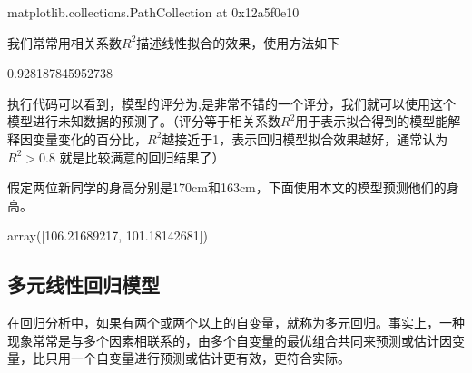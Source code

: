 \documentclass[letterpaper,10pt,english]{sphinxmanual}
\begin{document}
\begin{sphinxVerbatim}[commandchars=\\\{\}]
\PYGZlt{}matplotlib.collections.PathCollection at 0x12a5f0e10\PYGZgt{}
\end{sphinxVerbatim}

\noindent{}

我们常常用相关系数\(R^2\)描述线性拟合的效果，使用方法如下

\begin{sphinxVerbatim}[commandchars=\\\{\}]
\end{sphinxVerbatim}

\begin{sphinxVerbatim}[commandchars=\\\{\}]
0.928187845952738
\end{sphinxVerbatim}

执行代码可以看到，模型的评分为,是非常不错的一个评分，我们就可以使用这个模型进行未知数据的预测了。（评分等于相关系数\(R^2\)用于表示拟合得到的模型能解释因变量变化的百分比，\(R^2\)越接近于1，表示回归模型拟合效果越好，通常认为\(R^2 > 0.8\) 就是比较满意的回归结果了）

假定两位新同学的身高分别是170cm和163cm，下面使用本文的模型预测他们的身高。

\begin{sphinxVerbatim}[commandchars=\\\{\}]
\PYG{p}{[}\PYG{p}{[}\PYG{p}{]}\PYG{p}{[}\PYG{p}{]}\PYG{p}{]}
\end{sphinxVerbatim}

\begin{sphinxVerbatim}[commandchars=\\\{\}]
array([106.21689217, 101.18142681])
\end{sphinxVerbatim}


\subsection{多元线性回归模型}
\label{\detokenize{docs/prediction_model:id6}}
在回归分析中，如果有两个或两个以上的自变量，就称为多元回归。事实上，一种现象常常是与多个因素相联系的，由多个自变量的最优组合共同来预测或估计因变量，比只用一个自变量进行预测或估计更有效，更符合实际。
\end{document}
